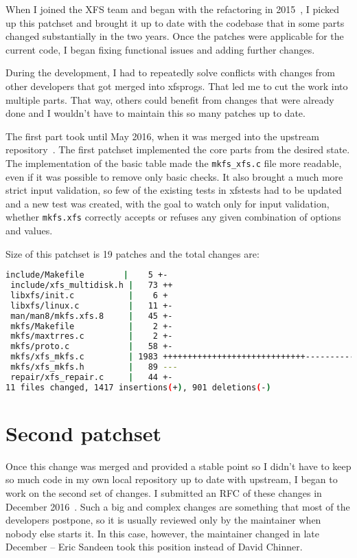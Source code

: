 When I joined the XFS team and began with the refactoring in
2015~\cite{myFirstPatches}, I picked up this patchset and brought it up to
date with the codebase that in some parts changed substantially in the two
years. Once the patches were applicable for the current code, I began
fixing functional issues and adding further changes.

During the development, I had to repeatedly solve conflicts with changes
from other developers that got merged into xfsprogs. That led me to cut the
work into multiple parts. That way, others could benefit from changes that
were already done and I wouldn't have to maintain this so many patches up
to date.

The first part took until May 2016, when it was merged into the upstream
repository~\cite{finalPatchset1,finalPatchset1Announce}.
The first patchset implemented the core parts from the desired state. The
implementation of the basic table made the {\tt mkfs\_xfs.c} file more
readable, even if it was possible to remove only basic checks. It also
brought a much more strict input validation, so few of the existing tests
in xfstests had to be updated and a new test was created, with the goal to
watch only for input validation, whether {\tt mkfs.xfs} correctly accepts
or refuses any given combination of options and values.

Size of this patchset is 19 patches and the total changes are:
\begin{lstlisting}[frame=none, basicstyle=\footnotesize\ttfamily, language=Bash, numbers=none, numberstyle=\tiny\color{black},caption= {Git statistics for the first patchset~\cite{finalPatchset1}.}]
include/Makefile        |    5 +-
 include/xfs_multidisk.h |   73 ++
 libxfs/init.c           |    6 +
 libxfs/linux.c          |   11 +-
 man/man8/mkfs.xfs.8     |   45 +-
 mkfs/Makefile           |    2 +-
 mkfs/maxtrres.c         |    2 +-
 mkfs/proto.c            |   58 +-
 mkfs/xfs_mkfs.c         | 1983 +++++++++++++++++++++++++++++------------------
 mkfs/xfs_mkfs.h         |   89 ---
 repair/xfs_repair.c     |   44 +-
11 files changed, 1417 insertions(+), 901 deletions(-)
\end{lstlisting}


\section{Second patchset}\label{chap:refactoring:second}

Once this change was merged and provided a stable point so I didn't have to
keep so much code in my own local repository up to date with upstream, I
began to work on the second set of changes. I submitted an
RFC of these
changes in December 2016~\cite{secondSetRFC}. Such a big and complex
changes are something that most of the developers postpone, so it is
usually reviewed only by the maintainer when nobody else starts it. In this
case, however, the maintainer changed in late December -- Eric Sandeen took
this position instead of David Chinner.

